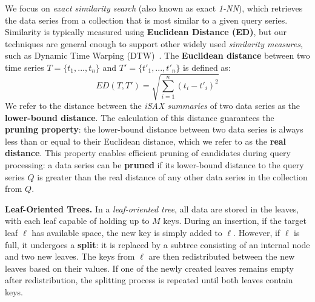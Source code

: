 We focus on \textit{exact similarity search} (also known as exact \textit{1-NN}),  
which retrieves the data series from a collection that is most similar to a given 
query series. Similarity is typically measured using \textbf{Euclidean Distance (ED)},
but our techniques are general enough to support other widely used 
\textit{similarity measures}, such as Dynamic Time Warping (DTW)~\cite{rakthanmanon2012searching}.  
% 
The \textbf{Euclidean distance} between two time series  
\( T = \{t_1, ... , t_n\} \) and \( T' = \{t'_1, ... , t'_n\} \)  
is defined as:  
\begin{equation}
ED(T, T') = \sqrt{\sum_{i=1}^{n} (t_i - t'_i)^2}
\label{eq:Euclidean-distance}
\end{equation} 
% 
We refer to the distance between the \textit{iSAX summaries} of two data series  
as the \textbf{lower-bound distance}. 
% 
The calculation of this distance guarantees the \textbf{pruning property}:  
the lower-bound distance between two data series is always less than or equal to  
their Euclidean distance, which we refer to as the \textbf{real distance}.  
% 
This property enables efficient pruning of candidates during query processing:  
a data series can be \textbf{pruned} if its lower-bound distance to the query series
\( Q \) is greater than the real distance of any other data series in the collection 
from \( Q \).

\noindent
{\bf Leaf-Oriented Trees.}  
In a \textit{leaf-oriented tree}, all data are stored in the leaves, with each leaf
capable of holding up to \( M \) keys.  
% 
During an insertion, if the target leaf \( \ell \) has available space,  
the new key is simply added to \( \ell \).  
However, if \( \ell \) is full, it undergoes a \textbf{split}: it is replaced 
by a subtree consisting of an internal node and two new leaves.  
The keys from \( \ell \) are then redistributed between the new leaves based on
their values.  
% 
If one of the newly created leaves remains empty after redistribution,  
the splitting process is repeated until both leaves contain keys.  

